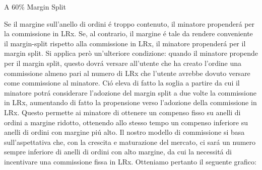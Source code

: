 \documentclass[UTF8,nofonts]{article}
\makeatletter
\newenvironment{figurehere}
 {\def\@captype{figure}}
 {}
\makeatother
\begin{document}
\begin{multicols}{2}
\begin{center}
\begin{figurehere}
\caption{A 60\% Margin Split}
\label{fig:marginsplit}
\end{figurehere}
\end{center}
Se il margine sull'anello di ordini \'e troppo contenuto, il minatore propender\'a per la commissione in LRx. Se, al contrario, il margine \'e tale da rendere conveniente il margin-split rispetto alla commissione in LRx, il minatore propender\'a per il margin split. Si applica però un'ulteriore condizione: quando il minatore propende per il margin split, questo dovr\'a versare all'utente che ha creato l'ordine una commissione almeno pari al numero di LRx che l'utente avrebbe dovuto versare come commissione al minatore. Ci\'o eleva di fatto la soglia a partire da cui il minatore potr\'a considerare l'adozione del margin split a due volte la commissione in LRx, aumentando di fatto la propensione verso l'adozione della commissione in LRx. Questo permette ai minatore di ottenere un compenso fisso su anelli di ordini a margine ridotto, ottenendo allo stesso tempo un compenso inferiore su anelli di ordini con margine pi\'u alto.
Il nostro modello di commissione si basa sull'aspettativa che, con la crescita e maturazione del mercato, ci sar\'a un numero sempre inferiore di anelli di ordini con alto margine, da cui la necessit\'a di incentivare una commissione fissa in LRx. Otteniamo pertanto il seguente grafico:

\begin{center}
\begin{figurehere}
\centering
{}
\end{figurehere}
\end{center}
\end{multicols}
\end{document}
